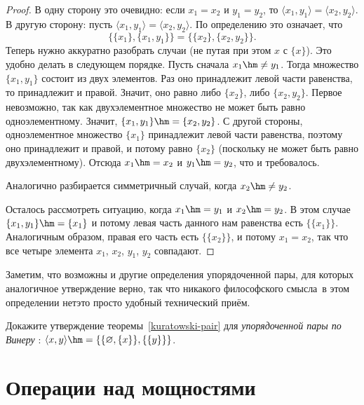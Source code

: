 \begin{proof}
В одну сторону это очевидно: если $x_1=x_2$ и $y_1=y_2$, то
$\langle x_1,y_1\rangle = \langle x_2,y_2\rangle$. В другую
сторону: пусть
        $
\langle x_1,y_1\rangle = \langle x_2,y_2\rangle
        $.
По определению это означает, что
        $$
{\{\{x_1\},\{x_1,y_1\}\}}=
{\{\{x_2\},\{x_2,y_2\}\}}.
        $$
Теперь нужно аккуратно разобрать случаи (не путая при этом $x$ с
$\{x\}$). Это удобно делать в следующем порядке. Пусть сначала
$x_1\hm\neq y_1$. Тогда множество ${\{x_1,y_1\}}$ состоит из
двух элементов. Раз оно принадлежит левой части равенства, то
принадлежит и правой. Значит, оно равно либо $\{x_2\}$, либо
${\{x_2,y_2\}}$. Первое невозможно, так как двухэлементное
множество не может быть равно одноэлементному. Значит,
${\{x_1,y_1\}}\hm= {\{x_2,y_2\}}$. С другой стороны,
одноэлементное множество $\{x_1\}$ принадлежит левой части
равенства, поэтому оно принадлежит и правой, и потому равно
$\{x_2\}$ (поскольку не может быть равно двухэлементному).
Отсюда $x_1\hm=x_2$ и $y_1\hm=y_2$, что и требовалось.

Аналогично разбирается симметричный случай, когда
$x_2\hm\neq y_2$.

Осталось рассмотреть ситуацию, когда $x_1\hm=y_1$ и
$x_2\hm=y_2$. В этом случае ${\{x_1,y_1\}}\hm=\{x_1\}$ и потому
левая часть данного нам равенства есть $\{\{x_1\}\}$.
Аналогичным образом, правая его часть есть $\{\{x_2\}\}$, и
потому $x_1=x_2$, так что все четыре элемента $x_1$, $x_2$, $y_1$, $y_2$
совпадают.
\end{proof}

Заметим, что возможны и другие определения упорядоченной пары,
для которых аналогичное утверждение верно, так что никакого 
философского смысла\ в этом
определении нет\т это просто
удобный технический приём\-.

\begin{problem}
Докажите утверждение теоремы~\ref{kuratowski-pair} для
\emph{упорядоченной пары по Винеру}%
:
$\langle x,y\rangle\hm=
\{\{\varnothing,\{x\}\},\{\{y\}\}\}$.
\end{problem}

\section{Операции над мощностями}%
        \label{cardinal-operations}%

